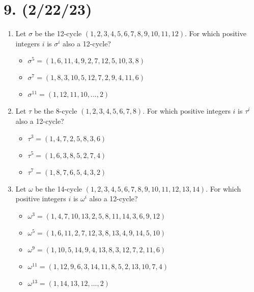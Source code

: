 \documentclass{article}
\begin{document}
\section*{9. (2/22/23)}

\begin{enumerate}[label=(\alph*)]
    \item Let $\sigma$ be the 12-cycle $(1, 2, 3, 4, 5, 6, 7, 8, 9, 10, 11, 12)$. For which positive integers $i$ is $\sigma^i$ also a 12-cycle?
        \begin{itemize}
            \item $\sigma^5 = (1, 6, 11, 4, 9, 2, 7, 12, 5, 10, 3, 8)$
            \item $\sigma^7 = (1, 8, 3, 10, 5, 12, 7, 2, 9, 4, 11, 6)$
            \item $\sigma^11 = (1, 12, 11, 10, ..., 2)$
        \end{itemize}
    \item Let $\tau$ be the 8-cycle $(1, 2, 3, 4, 5, 6, 7, 8)$. For which positive integers $i$ is $\tau^i$ also a 12-cycle?
        \begin{itemize}
            \item $\tau^3 = (1, 4, 7, 2, 5, 8, 3, 6)$
            \item $\tau^5 = (1, 6, 3, 8, 5, 2, 7, 4)$
            \item $\tau^7 = (1, 8, 7, 6, 5, 4, 3, 2)$
        \end{itemize}
    \item Let $\omega$ be the 14-cycle $(1, 2, 3, 4, 5, 6, 7, 8, 9, 10, 11, 12, 13, 14)$. For which positive integers $i$ is $\omega^i$ also a 12-cycle?
        \begin{itemize}
            \item $\omega^3 = (1, 4, 7, 10, 13, 2, 5, 8, 11, 14, 3, 6, 9, 12)$
            \item $\omega^5 = (1, 6, 11, 2, 7, 12, 3, 8, 13, 4, 9, 14, 5, 10)$
            \item $\omega^9 = (1, 10, 5, 14, 9, 4, 13, 8, 3, 12, 7, 2, 11, 6)$
            \item $\omega^{11} = (1, 12, 9, 6, 3, 14, 11, 8, 5, 2, 13, 10, 7, 4)$
            \item $\omega^{13} = (1, 14, 13, 12, ..., 2)$
        \end{itemize}
\end{enumerate}
\end{document}
